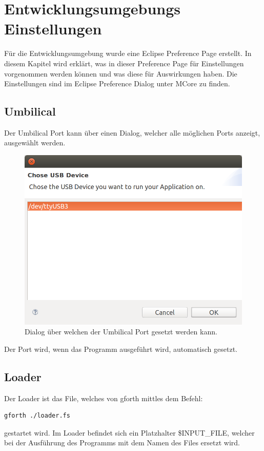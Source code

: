 \chapter{Entwicklungsumgebungs Einstellungen}
\label{chap:settings}
Für die Entwicklungsumgebung wurde eine Eclipse Preference Page erstellt. In diesem Kapitel wird erklärt, was in dieser Preference Page für Einstellungen vorgenommen werden können und was diese für Auswirkungen haben. Die Einstellungen sind im Eclipse Preference Dialog unter MCore zu finden.
\section{Umbilical}

Der Umbilical Port kann über einen Dialog, welcher alle möglichen Ports anzeigt, ausgewählt werden.

\begin{figure}[H]
	\centering
		\includegraphics[scale=0.3]{idesettings/umbilical.png}
		\caption{Dialog über welchen der Umbilical Port gesetzt werden kann.}
		\label{fig:umbilicalport}
\end{figure}

Der Port wird, wenn das Programm ausgeführt wird, automatisch gesetzt. 

\section{Loader}

Der Loader ist das File, welches von gforth mittles dem Befehl:
%
\begin{verbatim}
gforth ./loader.fs
\end{verbatim}
%
gestartet wird. Im Loader befindet sich ein Platzhalter \$INPUT\_FILE, welcher bei der Ausführung des Programms mit dem Namen des Files ersetzt wird.